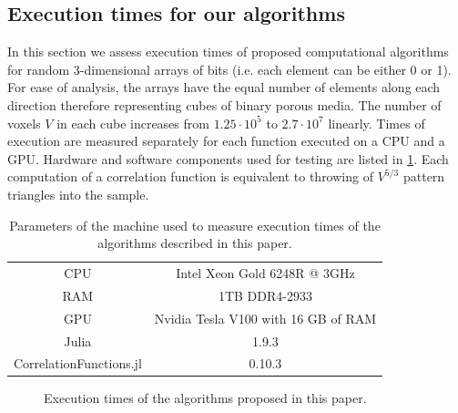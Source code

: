 \documentclass[reprint,amsmath,amssymb,aps,pre,showkeys,showpacs]{revtex4-1}
\begin{document}
\subsection{Execution times for our algorithms}
In this section we assess execution times of proposed computational algorithms
for random 3-dimensional arrays of bits (i.e. each element can be either 0 or
1). For ease of analysis, the arrays have the equal number of elements along
each direction therefore representing cubes of binary porous media. The number
of voxels $V$ in each cube increases from $1.25 \cdot 10^5$ to $2.7 \cdot 10^7$
linearly. Times of execution are measured separately for each function executed
on a CPU and a GPU. Hardware and software components used for testing are listed
in \cref{tab:machine}. Each computation of a correlation function is equivalent
to throwing of $V^{5/3}$ pattern triangles into the sample.
\begin{table}[!htp]
  \centering
  \begin{tabular}{|c|c|}
    CPU & Intel Xeon Gold 6248R @ 3GHz \\
    RAM & 1TB DDR4-2933 \\
    GPU & Nvidia Tesla V100 with 16 GB of RAM \\
    Julia & 1.9.3 \\
    CorrelationFunctions.jl & 0.10.3
  \end{tabular}
  \caption{Parameters of the machine used to measure execution times of the
    algorithms described in this paper.}
  \label{tab:machine}
\end{table}
\begin{figure}[tp]
  \centering
  \hfill
  \caption[]{Execution times of the algorithms proposed in this paper.}
  \label{fig:timings}
\end{figure}
\end{document}

